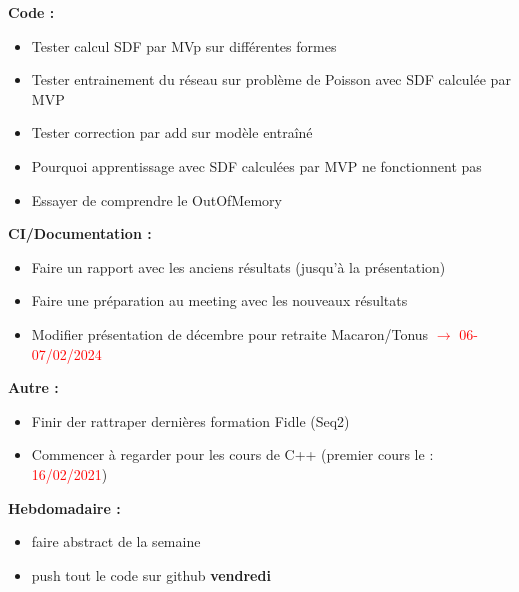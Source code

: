 \textbf{Code :}
\begin{itemize}[label=$\square$] 
	\item[\done] Tester calcul SDF par MVp sur différentes formes
	\item[\done] Tester entrainement du réseau sur problème de Poisson avec SDF calculée par MVP
	\item Tester correction par add sur modèle entraîné
	\item Pourquoi apprentissage avec SDF calculées par MVP ne fonctionnent pas
	\item Essayer de comprendre le OutOfMemory 
\end{itemize}
\textbf{CI/Documentation :}
\begin{itemize}[label=$\square$] 
	\item Faire un rapport avec les anciens résultats (jusqu'à la présentation)
	\item Faire une préparation au meeting avec les nouveaux résultats
	\item Modifier présentation de décembre pour retraite Macaron/Tonus \textcolor{red}{$\rightarrow$ 06-07/02/2024}
\end{itemize}
\textbf{Autre :}
\begin{itemize}[label=$\square$] 
	\item Finir der rattraper dernières formation Fidle (Seq2)
	\item Commencer à regarder pour les cours de C++ (premier cours le : \textcolor{red}{16/02/2021})
\end{itemize}
\textbf{Hebdomadaire :}
\begin{itemize}[label=$\square$] 
	\item[\done] faire abstract de la semaine 
	\item[\done] push tout le code sur github \textbf{vendredi}
\end{itemize}